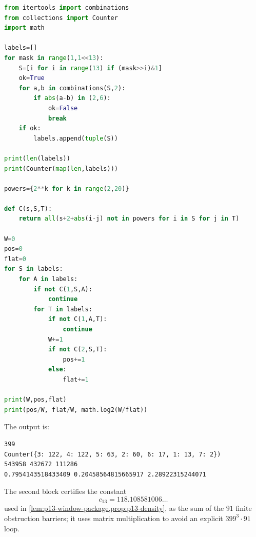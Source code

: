 \documentclass[11pt]{article}
\begin{document}
\begin{lstlisting}[language=Python]
from itertools import combinations
from collections import Counter
import math

labels=[]
for mask in range(1,1<<13):
    S=[i for i in range(13) if (mask>>i)&1]
    ok=True
    for a,b in combinations(S,2):
        if abs(a-b) in (2,6):
            ok=False
            break
    if ok:
        labels.append(tuple(S))

print(len(labels))
print(Counter(map(len,labels)))

powers={2**k for k in range(2,20)}

def C(s,S,T):
    return all(s+2+abs(i-j) not in powers for i in S for j in T)

W=0
pos=0
flat=0
for S in labels:
    for A in labels:
        if not C(1,S,A):
            continue
        for T in labels:
            if not C(1,A,T):
                continue
            W+=1
            if not C(2,S,T):
                pos+=1
            else:
                flat+=1

print(W,pos,flat)
print(pos/W, flat/W, math.log2(W/flat))
\end{lstlisting}

The output is:
\begin{lstlisting}
399
Counter({3: 122, 4: 122, 5: 63, 2: 60, 6: 17, 1: 13, 7: 2})
543958 432672 111286
0.7954143518433409 0.20458564815665917 2.28922315244071
\end{lstlisting}

The second block certifies the constant
\[
 c_{13}=118.108581006\ldots
\]
used in \cref{lem:p13-window-package,prop:p13-density}, as the sum of the
$91$ finite obstruction barriers; it uses matrix multiplication to avoid an
explicit $399^3\cdot91$ loop.
\end{document}

